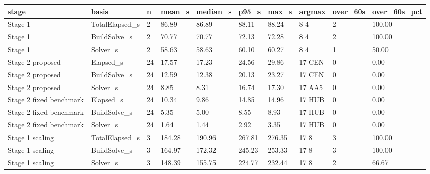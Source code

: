 \begin{tabular}{llllllllll}
\toprule
stage & basis & n & mean\_s & median\_s & p95\_s & max\_s & argmax & over\_60s & over\_60s\_pct \\
\midrule
Stage 1 & TotalElapsed\_s & 2 & 86.89 & 86.89 & 88.11 & 88.24 & 8 4 & 2 & 100.00 \\
Stage 1 & BuildSolve\_s & 2 & 70.77 & 70.77 & 72.13 & 72.28 & 8 4 & 2 & 100.00 \\
Stage 1 & Solver\_s & 2 & 58.63 & 58.63 & 60.10 & 60.27 & 8 4 & 1 & 50.00 \\
Stage 2 proposed & Elapsed\_s & 24 & 17.57 & 17.23 & 24.56 & 29.86 & 17 CEN & 0 & 0.00 \\
Stage 2 proposed & BuildSolve\_s & 24 & 12.59 & 12.38 & 20.13 & 23.27 & 17 CEN & 0 & 0.00 \\
Stage 2 proposed & Solver\_s & 24 & 8.85 & 8.31 & 16.74 & 17.30 & 17 AA5 & 0 & 0.00 \\
Stage 2 fixed benchmark & Elapsed\_s & 24 & 10.34 & 9.86 & 14.85 & 14.96 & 17 HUB & 0 & 0.00 \\
Stage 2 fixed benchmark & BuildSolve\_s & 24 & 5.35 & 5.00 & 8.55 & 8.93 & 17 HUB & 0 & 0.00 \\
Stage 2 fixed benchmark & Solver\_s & 24 & 1.64 & 1.44 & 2.92 & 3.35 & 17 HUB & 0 & 0.00 \\
Stage 1 scaling & TotalElapsed\_s & 3 & 184.28 & 190.96 & 267.81 & 276.35 & 17 8 & 3 & 100.00 \\
Stage 1 scaling & BuildSolve\_s & 3 & 164.97 & 172.32 & 245.23 & 253.33 & 17 8 & 3 & 100.00 \\
Stage 1 scaling & Solver\_s & 3 & 148.39 & 155.75 & 224.77 & 232.44 & 17 8 & 2 & 66.67 \\
\bottomrule
\end{tabular}
